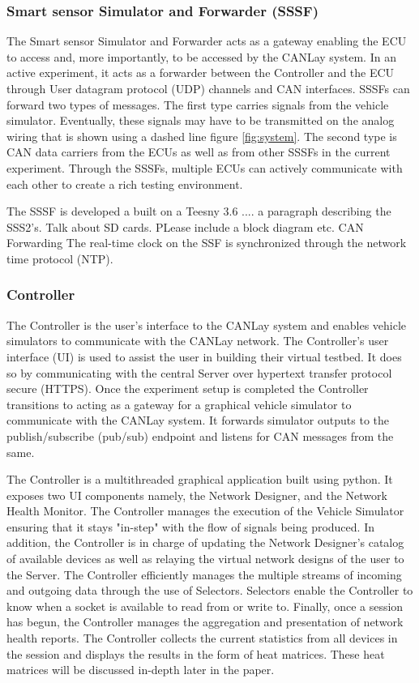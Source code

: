 \documentclass[letterpaper,twocolumn,12pt]{article}
\begin{document}
\subsubsection{Smart sensor Simulator and Forwarder (SSSF)}
The Smart sensor Simulator and Forwarder acts as a gateway enabling the ECU to access and, more importantly, to be accessed by the CANLay system. In an active experiment, it acts as a forwarder between the Controller and the ECU through User datagram protocol (UDP) channels and CAN interfaces. SSSFs can forward two types of messages. 
The first type carries signals from the vehicle simulator. Eventually, these signals may have to be transmitted on the analog wiring that is shown using a dashed line figure \ref{fig:system}.  
The second type is CAN data carriers from the ECUs as well as from other SSSFs in the current experiment. Through the SSSFs, multiple ECUs can actively communicate with each other to create a rich testing environment.

The SSSF is developed a built on a Teesny 3.6 .... a paragraph describing the SSS2's. Talk about SD cards. PLease include a block diagram etc.
CAN Forwarding 
The real-time clock on the SSF is synchronized through the network time protocol (NTP).

\subsubsection{Controller}
The Controller is the user's interface to the CANLay system and enables vehicle simulators to communicate with the CANLay network. The Controller’s user interface (UI) is used to assist the user in building their virtual testbed. 
It does so by communicating with the central Server over hypertext transfer protocol secure (HTTPS). 
Once the experiment setup is completed the Controller transitions to acting as a gateway for a graphical vehicle simulator to communicate with the CANLay system. It forwards simulator outputs to the publish/subscribe (pub/sub) endpoint and listens for CAN messages from the same.

The Controller is a multithreaded graphical application built using python. It exposes two UI components namely, the Network Designer, and the Network Health Monitor. The Controller manages the execution of the Vehicle Simulator ensuring that it stays "in-step" with the flow of signals being produced. In addition, the Controller is in charge of updating the Network Designer's catalog of available devices as well as relaying the virtual network designs of the user to the Server. The Controller efficiently manages the multiple streams of incoming and outgoing data through the use of Selectors. Selectors enable the Controller to know when a socket is available to read from or write to. Finally, once a session has begun, the Controller manages the aggregation and presentation of network health reports. The Controller collects the current statistics from all devices in the session and displays the results in the form of heat matrices. These heat matrices will be discussed in-depth later in the paper.
\end{document}

